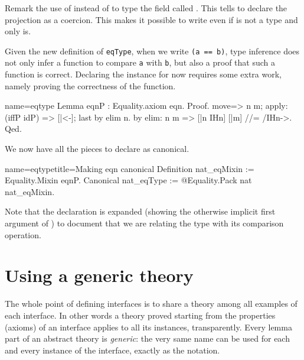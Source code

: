 Remark the use of \C{:>} instead of \C{:} to type the
field called .  This tells \Coq{} to declare the
 projection as a coercion. This makes it possible to
write  even if  is not
a type and only  is.



Given the new definition of \lstinline/eqType/,
when we write \lstinline/(a == b)/, type inference does not only infer
a function to compare \lstinline/a/ with \lstinline/b/, but also a
proof that such a function is correct.
Declaring the  instance for  now requires some
extra work, namely proving the correctness of the  function.

\begin{coq}{name=eqtype}{}
Lemma eqnP : Equality.axiom eqn.
Proof.
move=> n m; apply: (iffP idP) => [|<-]; last by elim n.
by elim: n m => [|n IHn] [|m] //= /IHn->.
Qed.
\end{coq}

We now have all the pieces to declare  as canonical.

\begin{coq}{name=eqtype}{title=Making eqn canonical}
Definition nat_eqMixin := Equality.Mixin eqnP.
Canonical nat_eqType := @Equality.Pack nat nat_eqMixin.
\end{coq}

Note that the  declaration is expanded (showing the
otherwise implicit first argument of ) to document that
we are relating the type  with its comparison operation.

\section{Using a generic theory}\label{sec:eqtypetheory}

The whole point of defining interfaces is to share a theory
among all examples of each interface.
In other words a theory proved starting from the
properties (axioms) of an interface applies to all its instances,
transparently.  Every lemma part of an abstract theory
is \emph{generic}: the very same name can be used for each and every
instance of the interface, exactly as the \C{==} notation.

